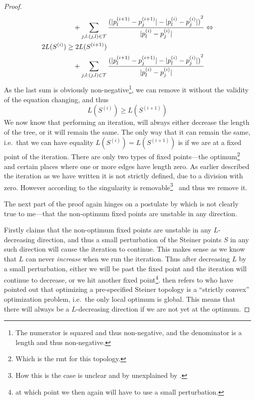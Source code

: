 \begin{proof}
\begin{align}
  &\quad + \sum_{j, l : (j,l) \in \mathcal{T}}
    \frac{{(|p_l^{(i+1)}-p_j^{(i+1)}| - |p_l^{(i)}-p_j^{(i)}|)}^2}{|p_l^{(i)}-p_j^{(i)}|} \Leftrightarrow \\
  2 L(S^{(i)}) &\ge 2 L(S^{(i+1)}) \\
  &\quad + \sum_{j, l : (j,l) \in \mathcal{T}}
    \frac{{(|p_l^{(i+1)}-p_j^{(i+1)}| - |p_l^{(i)}-p_j^{(i)}|)}^2}{|p_l^{(i)}-p_j^{(i)}|}
\end{align}
%
As the last sum is obviously non-negative\footnote{The numerator is squared and
  thus non-negative, and the denominator is a length and thus non-negative.}, we
can remove it without the validity of the equation changing, and thus
%
\begin{equation}
  L(S^{(i)}) \ge L(S^{(i+1)})
\end{equation}
%
We now know that performing an iteration, will always either decrease the length
of the tree, or it will remain the same. The only way that it can remain the
same, i.e.\ that we can have equality $L(S^{(i)}) = L(S^{(i+1)})$ is if we are
at a fixed point of the iteration. There are only two types of fixed
points---the optimum\footnote{Which is the \ac{rmt} for this topology.} and
certain places where one or more edges have length zero. As earlier described
the iteration as we have written it is not strictly defined, due to a division
with zero. However according to \citeauthor{smith1992} the singularity is
removable\footnote{How this is the case is unclear and by unexplained by
  \citeauthor{smith1992}.}~\cite{removablesingularity} and thus we remove it.

The next part of the proof again hinges on a postulate by \citeauthor{smith1992}
which is not clearly true to me---that the non-optimum fixed points are unstable
in any direction.

Firstly \citeauthor{smith1992} claims that the non-optimum fixed points are
unstable in any $L$-decreasing direction, and thus a small perturbation of the
Steiner points $S$ in any such direction will cause the iteration to
continue. This makes sense as we know that $L$ can never \textit{increase} when
we run the iteration. Thus after decreasing $L$ by a small perturbation, either
we will be past the fixed point and the iteration will continue to decrease, or
we hit another fixed point\footnote{at which point we then again will have to
  use a small perturbation.}. \citeauthor{smith1992} then refers to
\textcite{gilbert1968} who have pointed out that optimizing a pre-specified
Steiner topology is a ``strictly convex'' optimization problem, i.e.\ the only
local optimum is global. This means that there will always be a $L$-decreasing
direction if we are not yet at the optimum.


\end{proof}
